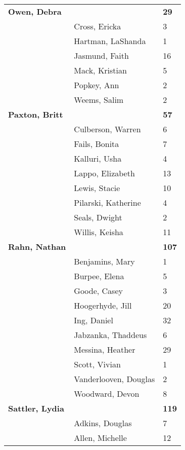 \documentclass{article}\usepackage[]{graphicx}\usepackage[]{color}
\begin{document}
{\begin{longtable} { >{\raggedright}p{}|p{}p{}}
  \textbf{Owen, Debra} &  & \hspace{2cm}\textbf{29} \\ 
   & Cross, Ericka & 3 \\ 
   & Hartman, LaShanda & 1 \\ 
   \rowcolor[gray]{0.90} & Jasmund, Faith & 16 \\ 
   \rowcolor[gray]{0.90} & Mack, Kristian & 5 \\ 
   \rowcolor[gray]{0.90} & Popkey, Ann & 2 \\ 
   & Weems, Salim & 2 \\ 
  \textbf{Paxton, Britt} &  & \hspace{2cm}\textbf{57} \\ 
   & Culberson, Warren & 6 \\ 
   \rowcolor[gray]{0.90} & Fails, Bonita & 7 \\ 
   \rowcolor[gray]{0.90} & Kalluri, Usha & 4 \\ 
   \rowcolor[gray]{0.90} & Lappo, Elizabeth & 13 \\ 
   & Lewis, Stacie & 10 \\ 
   & Pilarski, Katherine & 4 \\ 
   & Seals, Dwight & 2 \\ 
   \rowcolor[gray]{0.90} & Willis, Keisha & 11 \\ 
   \rowcolor[gray]{0.90}\textbf{Rahn, Nathan} &  & \hspace{2cm}\textbf{107} \\ 
   \rowcolor[gray]{0.90} & Benjamins, Mary & 1 \\ 
   & Burpee, Elena & 5 \\ 
   & Goode, Casey & 3 \\ 
   & Hoogerhyde, Jill & 20 \\ 
   \rowcolor[gray]{0.90} & Ing, Daniel & 32 \\ 
   \rowcolor[gray]{0.90} & Jabzanka, Thaddeus & 6 \\ 
   \rowcolor[gray]{0.90} & Messina, Heather & 29 \\ 
   & Scott, Vivian & 1 \\ 
   & Vanderlooven, Douglas & 2 \\ 
   & Woodward, Devon & 8 \\ 
   \rowcolor[gray]{0.90}\textbf{Sattler, Lydia} &  & \hspace{2cm}\textbf{119} \\ 
   \rowcolor[gray]{0.90} & Adkins, Douglas & 7 \\ 
   \rowcolor[gray]{0.90} & Allen, Michelle & 12 \\ 

\end{longtable}}
\end{document}
